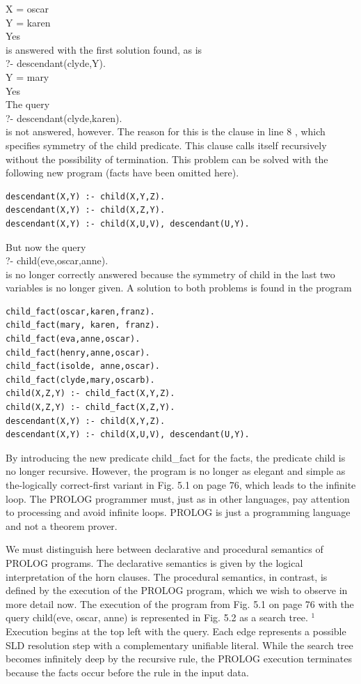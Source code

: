 \documentclass[10pt]{article}
\begin{document}
X = oscar\\
Y = karen\\
Yes\\
is answered with the first solution found, as is\\
?- descendant(clyde,Y).\\
Y = mary\\
Yes\\
The query\\
?- descendant(clyde,karen).\\
is not answered, however. The reason for this is the clause in line 8 , which specifies symmetry of the child predicate. This clause calls itself recursively without the possibility of termination. This problem can be solved with the following new program (facts have been omitted here).

\begin{verbatim}
descendant(X,Y) :- child(X,Y,Z).
descendant(X,Y) :- child(X,Z,Y).
descendant(X,Y) :- child(X,U,V), descendant(U,Y).
\end{verbatim}

But now the query\\
?- child(eve,oscar,anne).\\
is no longer correctly answered because the symmetry of child in the last two variables is no longer given. A solution to both problems is found in the program

\begin{verbatim}
child_fact(oscar,karen,franz).
child_fact(mary, karen, franz).
child_fact(eva,anne,oscar).
child_fact(henry,anne,oscar).
child_fact(isolde, anne,oscar).
child_fact(clyde,mary,oscarb).
child(X,Z,Y) :- child_fact(X,Y,Z).
child(X,Z,Y) :- child_fact(X,Z,Y).
descendant(X,Y) :- child(X,Y,Z).
descendant(X,Y) :- child(X,U,V), descendant(U,Y).
\end{verbatim}

By introducing the new predicate child\_fact for the facts, the predicate child is no longer recursive. However, the program is no longer as elegant and simple as the-logically correct-first variant in Fig. 5.1 on page 76, which leads to the infinite loop. The PROLOG programmer must, just as in other languages, pay attention to processing and avoid infinite loops. PROLOG is just a programming language and not a theorem prover.

We must distinguish here between declarative and procedural semantics of PROLOG programs. The declarative semantics is given by the logical interpretation of the horn clauses. The procedural semantics, in contrast, is defined by the execution of the PROLOG program, which we wish to observe in more detail now. The execution of the program from Fig. 5.1 on page 76 with the query child(eve, oscar, anne) is represented in Fig. 5.2 as a search tree. ${ }^{1}$ Execution begins at the top left with the query. Each edge represents a possible SLD resolution step with a complementary unifiable literal. While the search tree becomes infinitely deep by the recursive rule, the PROLOG execution terminates because the facts occur before the rule in the input data.
\end{document}
